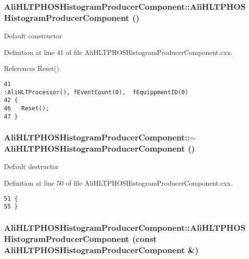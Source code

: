 \subsubsection{\setlength{\rightskip}{0pt plus 5cm}Ali\-HLTPHOSHistogram\-Producer\-Component::Ali\-HLTPHOSHistogram\-Producer\-Component ()}\label{classAliHLTPHOSHistogramProducerComponent_a0}


Default constructor 

Definition at line 41 of file Ali\-HLTPHOSHistogram\-Producer\-Component.cxx.

References Reset().

\footnotesize\begin{verbatim}41                                                                            :AliHLTProcessor(), fEventCount(0),  fEquippmentID(0)
42 {
46   Reset();
47 } 
\end{verbatim}\normalsize 


\subsubsection{\setlength{\rightskip}{0pt plus 5cm}Ali\-HLTPHOSHistogram\-Producer\-Component::$\sim${\bf Ali\-HLTPHOSHistogram\-Producer\-Component} ()\hspace{0.3cm}{\tt  [virtual]}}\label{classAliHLTPHOSHistogramProducerComponent_a1}


Default destructor 

Definition at line 50 of file Ali\-HLTPHOSHistogram\-Producer\-Component.cxx.

\footnotesize\begin{verbatim}51 {
55 }
\end{verbatim}\normalsize 


\subsubsection{\setlength{\rightskip}{0pt plus 5cm}Ali\-HLTPHOSHistogram\-Producer\-Component::Ali\-HLTPHOSHistogram\-Producer\-Component (const {\bf Ali\-HLTPHOSHistogram\-Producer\-Component} \&)}\label{classAliHLTPHOSHistogramProducerComponent_a2}


